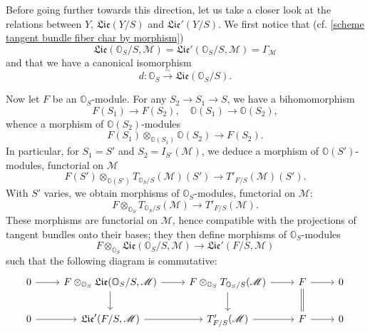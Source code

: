 Before going further towards this direction, let us take a closer look at the relations between $Y$, $\mathfrak{Lie}(Y/S)$ and $\mathfrak{Lie}'(Y/S)$. We first notice that (cf. \cref{scheme tangent bundle fiber char by morphism})
\begin{equation}\label{scheme Lie and Lie' of O_S isomorphism to Gamma-1}
\mathfrak{Lie}(\mathbb{O}_S/S,\mathscr{M})=\mathfrak{Lie}'(\mathbb{O}_S/S,\mathscr{M})=\Gamma_\mathscr{M}
\end{equation}
and that we have a canonical isomorphism
\begin{equation}\label{scheme Lie and Lie' of O_S isomorphism to Gamma-2}
d:\mathbb{O}_S\stackrel{\sim}{\to} \mathfrak{Lie}(\mathbb{O}_S/S).
\end{equation}

Now let $F$ be an $\mathbb{O}_S$-module. For any $S_2\to S_1\to S$, we have a bihomomorphism
\begin{equation}\label{scheme Lie and Lie' relation morphism-1}
F(S_1)\to F(S_2),\quad \mathbb{O}(S_1)\to\mathbb{O}(S_2),
\end{equation}
whence a morphism of $\mathbb{O}(S_2)$-modules
\[F(S_1)\otimes_{\mathbb{O}(S_1)}\mathbb{O}(S_2)\to F(S_2).\]
In particular, for $S_1=S'$ and $S_2=I_{S'}(\mathscr{M})$, we deduce a morphism of $\mathbb{O}(S')$-modules, functorial on $\mathscr{M}$
\[F(S')\otimes_{\mathbb{O}(S')}T_{\mathbb{O}_S/S}(\mathscr{M})(S')\to T'_{F/S}(\mathscr{M})(S').\]
With $S'$ varies, we obtain morphisms of $\mathbb{O}_S$-modules, functorial on $\mathscr{M}$:
\begin{equation}\label{scheme Lie and Lie' relation morphism-2}
F\otimes_{\mathbb{O}_S}T_{\mathbb{O}_S/S}(\mathscr{M})\to T'_{F/S}(\mathscr{M}).
\end{equation}
These morphisms are functorial on $\mathscr{M}$, hence compatible with the projections of tangent bundles onto their bases; they then define morphisms of $\mathbb{O}_S$-modules
\begin{equation}\label{scheme Lie and Lie' relation morphism-3}
F\otimes_{\mathbb{O}_S}\mathfrak{Lie}(\mathbb{O}_S/S,\mathscr{M})\to\mathfrak{Lie}'(F/S,\mathscr{M})
\end{equation}
such that the following diagram is commutative:
\[\begin{tikzcd}
0\ar[r]&F\otimes_{\mathbb{O}_S}\mathfrak{Lie}(\mathbb{O}_S/S,\mathscr{M})\ar[d]\ar[r]&F\otimes_{\mathbb{O}_S}T_{\mathbb{O}_S/S}(\mathscr{M})\ar[d]\ar[r]&F\ar[r]\ar[d,equal]&0\\
0\ar[r]&\mathfrak{Lie}'(F/S,\mathscr{M})\ar[r]&T'_{F/S}(\mathscr{M})\ar[r]&F\ar[r]&0
\end{tikzcd}\]
